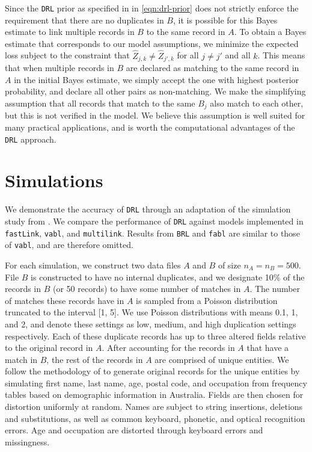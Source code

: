 \documentclass[12pt,letterpaper]{article}
\newcommand{\1}[1]{\mathbb{I}\!\left[#1\right]} %
\begin{document}
Since the \texttt{DRL} prior as specified in in \eqref{eqn:drl-prior} does not strictly enforce the requirement that there are no duplicates in $B$, it is possible for this Bayes estimate to link multiple records in $B$ to the same record in $A$. To obtain a Bayes estimate that corresponds to our model assumptions, we minimize the expected loss subject to the constraint that $\hat{Z}_{j, k} \neq \hat{Z}_{j', k}$ for all $j \neq j'$ and all $k$. This means that when multiple records in $B$ are declared as matching to the same record in $A$ in the initial Bayes estimate, we simply accept the one with highest posterior probability, and declare all other pairs as non-matching. We make the simplifying assumption that all records that match to the same $B_j$ also match to each other, but this is not verified in the model. We believe this assumption is well suited for many practical applications, and is worth the computational advantages of the \texttt{DRL} approach.

\section{Simulations}\label{sec:simulations}

We demonstrate the accuracy of \texttt{DRL} through an adaptation of the simulation study from \cite{aleshin2023multifile}. We compare the performance of \texttt{DRL} against models implemented in \texttt{fastLink}, \texttt{vabl}, and \texttt{multilink}. Results from \texttt{BRL} and \texttt{fabl} are similar to those of \texttt{vabl}, and are therefore omitted. 

For each simulation, we construct two data files $A$ and $B$ of size $n_A = n_B = 500$. File $B$ is constructed to have no internal duplicates, and we designate 10\% of the records in $B$ (or 50 records) to have some number of matches in $A$. The number of matches these records have in $A$ is sampled from a Poisson distribution truncated to the interval [1, 5]. We use Poisson distributions with means 0.1, 1, and 2, and denote these settings as low, medium, and high duplication settings respectively. Each of these duplicate records has up to three altered fields relative to the original record in $A$. After accounting for the records in $A$ that have a match in $B$, the rest of the records in $A$ are comprised of unique entities. We follow the methodology of \cite{christen_vatsalan2013} to generate original records for the unique entities by simulating first name, last name, age, postal code, and occupation from frequency tables based on demographic information in Australia. Fields are then chosen for distortion uniformly at random. Names are subject to string insertions, deletions and substitutions, as well as common keyboard, phonetic, and optical recognition errors. Age and occupation are distorted through keyboard errors and missingness.
\end{document}
